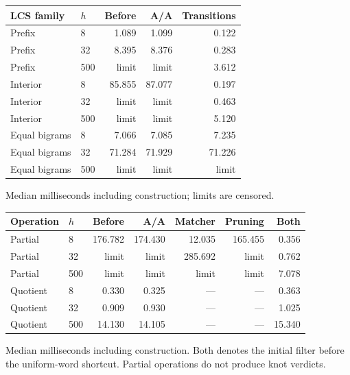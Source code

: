 \begin{center}\small
\begin{tabular}{@{}llrrr@{}}
\toprule
LCS family & $h$ & Before & A/A & Transitions \\
\midrule
Prefix & 8 & 1.089 & 1.099 & 0.122 \\
Prefix & 32 & 8.395 & 8.376 & 0.283 \\
Prefix & 500 & limit & limit & 3.612 \\
Interior & 8 & 85.855 & 87.077 & 0.197 \\
Interior & 32 & limit & limit & 0.463 \\
Interior & 500 & limit & limit & 5.120 \\
Equal bigrams & 8 & 7.066 & 7.085 & 7.235 \\
Equal bigrams & 32 & 71.284 & 71.929 & 71.226 \\
Equal bigrams & 500 & limit & limit & limit \\
\bottomrule
\end{tabular}
\end{center}
Median milliseconds including construction; limits are censored.
\begin{center}\footnotesize
\begin{tabular}{@{}llrrrrr@{}}
\toprule
Operation & $h$ & Before & A/A & Matcher & Pruning & Both \\
\midrule
Partial & 8 & 176.782 & 174.430 & 12.035 & 165.455 & 0.356 \\
Partial & 32 & limit & limit & 285.692 & limit & 0.762 \\
Partial & 500 & limit & limit & limit & limit & 7.078 \\
Quotient & 8 & 0.330 & 0.325 & --- & --- & 0.363 \\
Quotient & 32 & 0.909 & 0.930 & --- & --- & 1.025 \\
Quotient & 500 & 14.130 & 14.105 & --- & --- & 15.340 \\
\bottomrule
\end{tabular}
\end{center}
Median milliseconds including construction. Both denotes the initial filter before the uniform-word shortcut. Partial operations do not produce knot verdicts.
